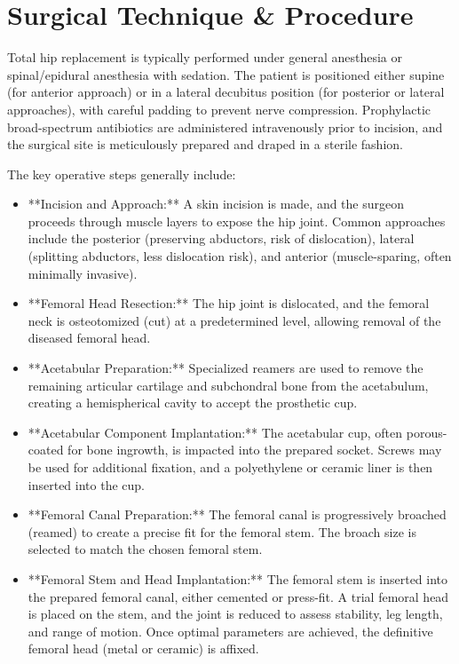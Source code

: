 \section*{Surgical Technique \& Procedure}
Total hip replacement is typically performed under general anesthesia or spinal/epidural anesthesia with sedation. The patient is positioned either supine (for anterior approach) or in a lateral decubitus position (for posterior or lateral approaches), with careful padding to prevent nerve compression. Prophylactic broad-spectrum antibiotics are administered intravenously prior to incision, and the surgical site is meticulously prepared and draped in a sterile fashion.

The key operative steps generally include:

\begin{itemize}
  \item **Incision and Approach:** A skin incision is made, and the surgeon proceeds through muscle layers to expose the hip joint. Common approaches include the posterior (preserving abductors, risk of dislocation), lateral (splitting abductors, less dislocation risk), and anterior (muscle-sparing, often minimally invasive).
  
  \item **Femoral Head Resection:** The hip joint is dislocated, and the femoral neck is osteotomized (cut) at a predetermined level, allowing removal of the diseased femoral head.
  
  \item **Acetabular Preparation:** Specialized reamers are used to remove the remaining articular cartilage and subchondral bone from the acetabulum, creating a hemispherical cavity to accept the prosthetic cup.
  
  \item **Acetabular Component Implantation:** The acetabular cup, often porous-coated for bone ingrowth, is impacted into the prepared socket. Screws may be used for additional fixation, and a polyethylene or ceramic liner is then inserted into the cup.
  
  \item **Femoral Canal Preparation:** The femoral canal is progressively broached (reamed) to create a precise fit for the femoral stem. The broach size is selected to match the chosen femoral stem.
  
  \item **Femoral Stem and Head Implantation:** The femoral stem is inserted into the prepared femoral canal, either cemented or press-fit. A trial femoral head is placed on the stem, and the joint is reduced to assess stability, leg length, and range of motion. Once optimal parameters are achieved, the definitive femoral head (metal or ceramic) is affixed.
  

\end{itemize}
